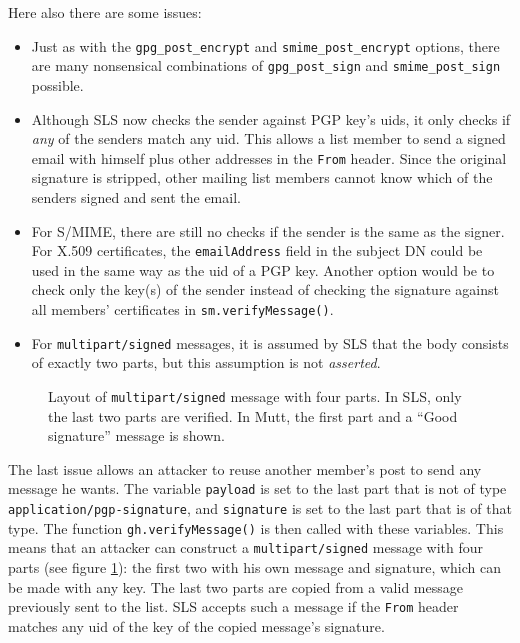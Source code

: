 \documentclass[a4]{article}
\newcommand{\var}[1]{\texttt{#1}}
\newcommand{\func}[1]{\texttt{#1()}}
\newcommand{\hdr}[1]{\texttt{#1}}
\newcommand{\mime}[1]{\texttt{#1}}
\begin{document}
Here also there are some issues:
\begin{itemize}
\item Just as with the \var{gpg\_post\_encrypt} and \var{smime\_post\_encrypt} options,
there are many nonsensical combinations of \var{gpg\_post\_sign} and \var{smime\_post\_sign} possible.
\item Although SLS now checks the sender against PGP key's uids,
it only checks if \emph{any} of the senders match any uid.
This allows a list member to send a signed email with himself plus other addresses in the \hdr{From} header.
Since the original signature is stripped, other mailing list members cannot know which of the senders signed and sent the email.
\item For S/MIME, there are still no checks if the sender is the same as the signer.
For X.509 certificates, the \hdr{emailAddress} field in the subject DN could be used in the same way as the uid of a PGP key.
Another option would be to check only the key(s) of the sender instead of checking the signature against all members' certificates in \func{sm.verifyMessage}.
\item For \mime{multipart/signed} messages, it is assumed by SLS that the body consists of exactly two parts,
but this assumption is not \emph{asserted}.
\end{itemize}

\begin{figure}
\begin{center}

\end{center}
\caption{\small Layout of \mime{multipart/signed} message with four parts.
In SLS, only the last two parts are verified.
In Mutt, the first part and a ``Good signature'' message is shown.
}
\label{fig:fourpartmime}
\end{figure}
The last issue allows an attacker to reuse another member's post to send any message he wants.
The variable \var{payload} is set to the last part that is not of type \mime{application/pgp-signature},
and \var{signature} is set to the last part that is of that type.
The function \func{gh.verifyMessage} is then called with these variables.
This means that an attacker can construct a \mime{multipart/signed} message with four parts (see figure \ref{fig:fourpartmime}):
the first two with his own message and signature, which can be made with any key.
The last two parts are copied from a valid message previously sent to the list.
SLS accepts such a message if the \hdr{From} header matches any uid of the key of the copied message's signature.
\end{document}
